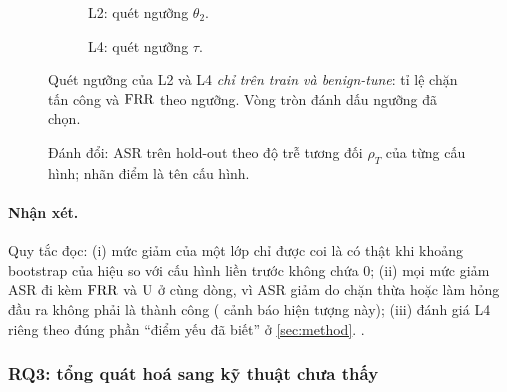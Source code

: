 \begin{table}[t]
\centering\small
\caption[Chi phí: số lần gọi mô hình và độ trễ]{Chi phí: số lần gọi mô hình và độ trễ trung bình, tuyệt đối và tương đối so với baseline.}\label{tab:cost}
\end{table}

\begin{figure}[t]
\centering
\begin{subfigure}[t]{0.49\linewidth}\centering{}\caption{L2: quét ngưỡng $\theta_2$.}\end{subfigure}\hfill
\begin{subfigure}[t]{0.49\linewidth}\centering{}\caption{L4: quét ngưỡng $\tau$.}\end{subfigure}
\caption[Quét ngưỡng của L2 và L4]{Quét ngưỡng của L2 và L4 \emph{chỉ trên train và benign-tune}: tỉ lệ chặn tấn công và $\mathrm{FRR}$ theo ngưỡng. Vòng tròn đánh dấu ngưỡng đã chọn.}\label{fig:sweep}
\end{figure}

\begin{figure}[t]
\centering
{}
\caption[Đánh đổi giữa ASR và độ trễ]{Đánh đổi: ASR trên hold-out theo độ trễ tương đối $\rho_T$ của từng cấu hình; nhãn điểm là tên cấu hình.}\label{fig:tradeoff}
\end{figure}

\paragraph{Nhận xét.} Quy tắc đọc: (i) mức giảm của một lớp chỉ được coi là có thật khi khoảng bootstrap của hiệu so với cấu hình liền trước không chứa 0; (ii) mọi mức giảm ASR đi kèm $\mathrm{FRR}$ và $\mathrm{U}$ ở cùng dòng, vì ASR giảm do chặn thừa hoặc làm hỏng đầu ra không phải là thành công (\citet{wang2026landscape} cảnh báo hiện tượng này); (iii) đánh giá L4 riêng theo đúng phần ``điểm yếu đã biết'' ở \cref{sec:method}. .

\subsubsection{RQ3: tổng quát hoá sang kỹ thuật chưa thấy}\label{sec:res-rq3}
\begin{table}[t]
\centering\small
\caption[Khoảng cách tổng quát hoá]{Khoảng cách tổng quát hoá $\Delta_{\mathrm{gen}}$ của từng cấu hình: hold-out trừ train, và test\_indist trừ train.}\label{tab:gen-gap}
\end{table}

